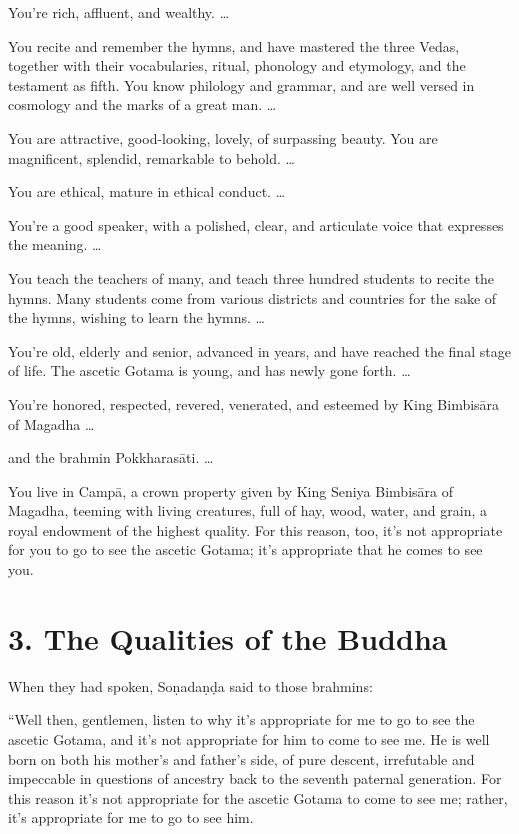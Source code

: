 \documentclass[12pt,openany]{book}%
\begin{document}
You’re rich, affluent, and wealthy. … 

You recite and remember the hymns, and have mastered the three Vedas, together with their vocabularies, ritual, phonology and etymology, and the testament as fifth. You know philology and grammar, and are well versed in cosmology and the marks of a great man. … 

You are attractive, good-looking, lovely, of surpassing beauty. You are magnificent, splendid, remarkable to behold. … 

You are ethical, mature in ethical conduct. … 

You’re a good speaker, with a polished, clear, and articulate voice that expresses the meaning. … 

You teach the teachers of many, and teach three hundred students to recite the hymns. Many students come from various districts and countries for the sake of the hymns, wishing to learn the hymns. … 

You’re old, elderly and senior, advanced in years, and have reached the final stage of life. The ascetic Gotama is young, and has newly gone forth. … 

You’re honored, respected, revered, venerated, and esteemed by King \textsanskrit{Bimbisāra} of Magadha … 

and the brahmin \textsanskrit{Pokkharasāti}. … 

You live in \textsanskrit{Campā}, a crown property given by King Seniya \textsanskrit{Bimbisāra} of Magadha, teeming with living creatures, full of hay, wood, water, and grain, a royal endowment of the highest quality. For this reason, too, it’s not appropriate for you to go to see the ascetic Gotama; it’s appropriate that he comes to see you. 

\section*{3. The Qualities of the Buddha }

When they had spoken, \textsanskrit{Soṇadaṇḍa} said to those brahmins: 

“Well then, gentlemen, listen to why it’s appropriate for me to go to see the ascetic Gotama, and it’s not appropriate for him to come to see me. He is well born on both his mother’s and father’s side, of pure descent, irrefutable and impeccable in questions of ancestry back to the seventh paternal generation. For this reason it’s not appropriate for the ascetic Gotama to come to see me; rather, it’s appropriate for me to go to see him. 
\end{document}
